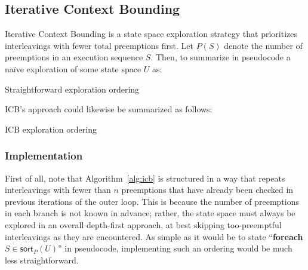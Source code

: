 \subsection{Iterative Context Bounding}
\label{sec:landslide-icb}

Iterative Context Bounding \cite{chess-icb} is a state space exploration strategy
that prioritizes interleavings with fewer total preemptions first.
Let $P(S)$ denote the number of preemptions in an execution sequence $S$.
Then, to summarize in pseudocode a na\"ive exploration of some state space $U$ as:

\begin{algorithm}[h]
	\caption{Straightforward exploration ordering}
	\label{alg:not-icb}
\end{algorithm}

ICB's approach could likewise be summarized as follows:

\begin{algorithm}[h]
	\caption{ICB exploration ordering}
	\label{alg:icb}
\end{algorithm}


\subsubsection{Implementation}

First of all, note that Algorithm~\ref{alg:icb} is structured in a way that repeats interleavings
with fewer than $n$ preemptions that have already been checked in previous iterations of the outer loop.
This is because the number of preemptions in each branch is not known in advance;
rather, the state space must always be explored in an overall depth-first approach,
at best skipping too-preemptful interleavings as they are encountered.
As simple as it would be to state ``{\bf foreach} $S \in {\mathsf{sort}_P(U)}$'' in pseudocode,
implementing such an ordering would be much less straightforward. %

